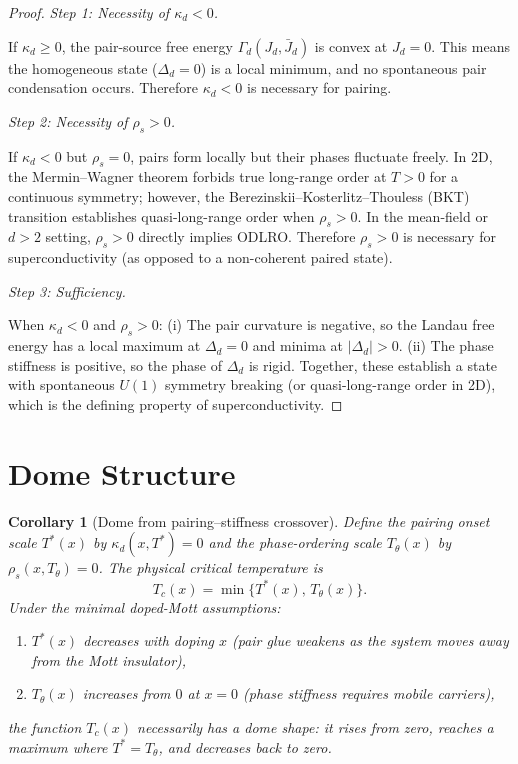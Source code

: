 \documentclass[12pt]{article}
\theoremstyle{plain}
\newtheorem{corollary}[theorem]{Corollary}
\theoremstyle{definition}
\numberwithin{equation}{section}
\begin{document}
\begin{proof}
\emph{Step 1: Necessity of $\kappa_d<0$.}

If $\kappa_d\geq 0$, the pair-source free energy
$\Gamma_d(J_d,\bar{J}_d)$ is convex at $J_d=0$.  This means
the homogeneous state ($\Delta_d=0$) is a local minimum, and no
spontaneous pair condensation occurs.  Therefore $\kappa_d<0$ is
necessary for pairing.

\emph{Step 2: Necessity of $\rho_s>0$.}

If $\kappa_d<0$ but $\rho_s=0$, pairs form locally but their
phases fluctuate freely.  In 2D, the Mermin--Wagner theorem forbids
true long-range order at $T>0$ for a continuous symmetry; however,
the Berezinskii--Kosterlitz--Thouless (BKT) transition establishes
quasi-long-range order when $\rho_s>0$.  In the mean-field or
$d>2$ setting, $\rho_s>0$ directly implies ODLRO.
Therefore $\rho_s>0$ is necessary for superconductivity
(as opposed to a non-coherent paired state).

\emph{Step 3: Sufficiency.}

When $\kappa_d<0$ and $\rho_s>0$:
(i) The pair curvature is negative, so the Landau free energy has
a local maximum at $\Delta_d=0$ and minima at $|\Delta_d|>0$.
(ii) The phase stiffness is positive, so the phase of $\Delta_d$
is rigid.
Together, these establish a state with spontaneous $U(1)$ symmetry
breaking (or quasi-long-range order in 2D), which is the defining
property of superconductivity.
\end{proof}


\section{Dome Structure}\label{sec:dome}

\begin{corollary}[Dome from pairing--stiffness crossover]\label{cor:dome}
Define the pairing onset scale $T^*(x)$ by $\kappa_d(x,T^*)=0$
and the phase-ordering scale $T_\theta(x)$ by $\rho_s(x,T_\theta)=0$.
The physical critical temperature is
\begin{equation}\label{eq:Tc}
\boxed{T_c(x) = \min\{T^*(x),\,T_\theta(x)\}.}
\end{equation}
Under the minimal doped-Mott assumptions:
\begin{enumerate}[label=(\roman*)]
\item $T^*(x)$ decreases with doping $x$ (pair glue weakens as
the system moves away from the Mott insulator),
\item $T_\theta(x)$ increases from $0$ at $x=0$ (phase stiffness
requires mobile carriers),
\end{enumerate}
the function $T_c(x)$ necessarily has a dome shape: it rises from
zero, reaches a maximum where $T^*=T_\theta$, and decreases back
to zero.
\end{corollary}
\end{document}
